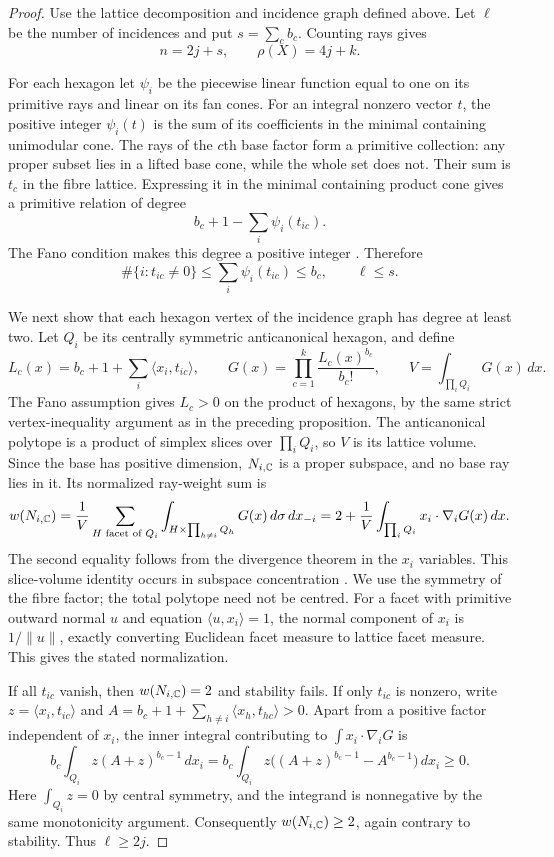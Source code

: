 \begin{proof}
Use the lattice decomposition and incidence graph defined above.
Let $\ell$ be the number of incidences and put $s=\sum_cb_c$.
Counting rays gives
\[
 n=2j+s,\qquad\rho(X)=4j+k.
\]

For each hexagon let $\psi_i$ be the piecewise linear function equal
to one on its primitive rays and linear on its fan cones. For an
integral nonzero vector $t$, the positive integer $\psi_i(t)$ is the
sum of its coefficients in the minimal containing unimodular cone.
The rays of the $c$th base factor form a primitive collection:
any proper subset lies in a lifted base cone, while the whole set does not.
Their sum is $t_c$ in the fibre lattice. Expressing it in the minimal
containing product cone gives a primitive relation of degree
\[
 b_c+1-\sum_i\psi_i(t_{ic}).
\]
The Fano condition makes this degree a positive integer
\cite[Theorem~6.4.9(b)]{CoxLittleSchenck2011}. Therefore
\[
 \#\{i:t_{ic}\ne0\}\le\sum_i\psi_i(t_{ic})\le b_c,
 \qquad \ell\le s.
\]

We next show that each hexagon vertex of the incidence graph has
degree at least two. Let $Q_i$ be its centrally symmetric
anticanonical hexagon, and define
\[
 L_c(x)=b_c+1+\sum_i\langle x_i,t_{ic}\rangle,\qquad
 G(x)=\prod_{c=1}^k\frac{L_c(x)^{b_c}}{b_c!},\qquad
 V=\int_{\prod_iQ_i}G(x)\,dx.
\]
The Fano assumption gives $L_c>0$ on the product of hexagons, by the
same strict vertex-inequality argument as in the preceding proposition.
The anticanonical polytope is a product of simplex slices over
$\prod_iQ_i$, so $V$ is its lattice volume.
Since the base has positive dimension, $N_{i,\mathbb{C}}$ is a proper
subspace, and no base ray lies in it. Its normalized ray-weight sum is
\[
 w(N_{i,\mathbb{C}})
 =\frac1V\sum_{H\text{ facet of }Q_i}
   \int_{H\times\prod_{h\ne i}Q_h}G(x)\,d\sigma\,dx_{-i}
 =2+\frac1V\int_{\prod_iQ_i}x_i\cdot\nabla_iG(x)\,dx.
\]
The second equality follows from the divergence theorem in the $x_i$
variables. This slice-volume identity occurs in subspace concentration
\cite[Eq.~(4.4)]{HenkLinke2014}. We use the symmetry of the fibre
factor; the total polytope need not be centred.
For a facet with primitive outward normal $u$ and equation
$\langle u,x_i\rangle=1$, the normal component of $x_i$ is
$1/\|u\|$, exactly converting Euclidean facet measure to lattice
facet measure. This gives the stated normalization.

If all $t_{ic}$ vanish, then $w(N_{i,\mathbb{C}})=2$ and stability fails.
If only $t_{ic}$ is nonzero, write
$z=\langle x_i,t_{ic}\rangle$ and
$A=b_c+1+\sum_{h\ne i}\langle x_h,t_{hc}\rangle>0$. Apart from a
positive factor independent of $x_i$, the inner integral contributing
to $\int x_i\cdot\nabla_iG$ is
\[
 b_c\int_{Q_i}z(A+z)^{b_c-1}\,dx_i
 =b_c\int_{Q_i}z\big((A+z)^{b_c-1}-A^{b_c-1}\big)\,dx_i\ge0.
\]
Here $\int_{Q_i}z=0$ by central symmetry, and the integrand is
nonnegative by the same monotonicity argument. Consequently
$w(N_{i,\mathbb{C}})\ge2$, again contrary to stability. Thus $\ell\ge2j$.


\end{proof}
